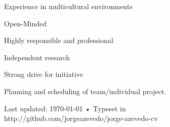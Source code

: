 {
Experience in multicultural environments

Open-Minded

Highly responsible and professional
}
{
Independent research

Strong drive for initiative

Planning and scheduling of team/individual project.
}


\vfill

\begin{center}
{
    \scriptsize  Last updated: \today\- •\- 
    Typeset in \XeLaTeX\\
    http://github.com/jorgeazevedo/jorge-azevedo-cv
}

\end{center}

